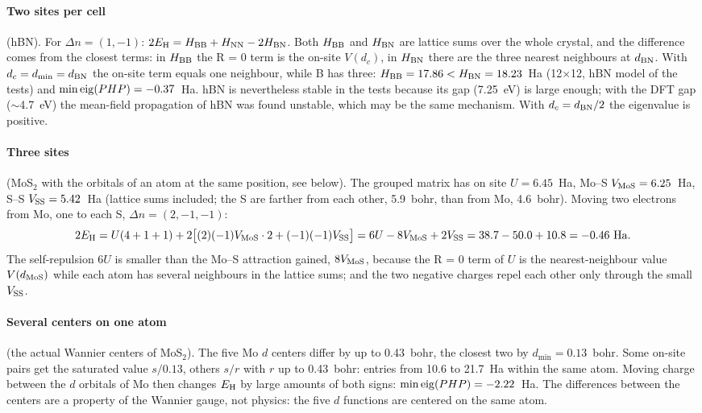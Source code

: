 \documentclass[11pt]{article}
\newcommand{\Dn}{\Delta n}
\begin{document}
\paragraph{Two sites per cell} (hBN). For $\Dn = (1,-1)$: $2E_{\rm H} = H_{\rm BB} + H_{\rm NN} - 2H_{\rm BN}$. Both $H_{\rm BB}$
and $H_{\rm BN}$ are lattice sums over the whole crystal, and the difference comes from the closest terms: in
$H_{\rm BB}$ the R = 0 term is the on-site $V(d_c)$, in $H_{\rm BN}$ there are the three nearest neighbours at $d_{\rm BN}$.
With $d_c = d_{\min} = d_{\rm BN}$ the on-site term equals one neighbour, while B has three: $H_{\rm BB} = 17.86 <
H_{\rm BN} = 18.23$~Ha (12$\times$12, hBN model of the tests) and $\min{\rm eig}(PHP) = -0.37$~Ha. hBN is nevertheless
stable in the tests because its gap (7.25~eV) is large enough; with the DFT gap ($\sim$4.7~eV) the mean-field
propagation of hBN was found unstable, which may be the same mechanism. With $d_c = d_{\rm BN}/2$ the eigenvalue is
positive.

\paragraph{Three sites} (MoS$_2$ with the orbitals of an atom at the same position, see below). The grouped matrix
has on site $U = 6.45$~Ha, Mo--S $V_{\rm MoS} = 6.25$~Ha, S--S $V_{\rm SS}=5.42$~Ha (lattice sums included; the
S are farther from each other, 5.9~bohr, than from Mo, 4.6~bohr). Moving two electrons from Mo, one to each S,
$\Dn = (2,-1,-1)$:
\[
2E_{\rm H} = U(4+1+1) + 2\big[(2)(-1)V_{\rm MoS}\cdot 2 + (-1)(-1)V_{\rm SS}\big]
          = 6U - 8V_{\rm MoS} + 2V_{\rm SS} = 38.7 - 50.0 + 10.8 = -0.46~{\rm Ha}.
\]
The self-repulsion $6U$ is smaller than the Mo--S attraction gained, $8V_{\rm MoS}$, because the R = 0 term of $U$ is the
nearest-neighbour value $V(d_{\rm MoS})$ while each atom has several neighbours in the lattice sums; and the two
negative charges repel each other only through the small $V_{\rm SS}$.

\paragraph{Several centers on one atom} (the actual Wannier centers of MoS$_2$). The five Mo $d$ centers differ by up
to 0.43~bohr, the closest two by $d_{\min} = 0.13$~bohr. Some on-site pairs get the saturated value $s/0.13$, others
$s/r$ with $r$ up to 0.43~bohr: entries from 10.6 to 21.7~Ha within the same atom. Moving charge between the $d$
orbitals of Mo then changes $E_{\rm H}$ by large amounts of both signs: $\min{\rm eig}(PHP) = -2.22$~Ha. The
differences between the centers are a property of the Wannier gauge, not physics: the five $d$ functions are centered
on the same atom.
\end{document}
